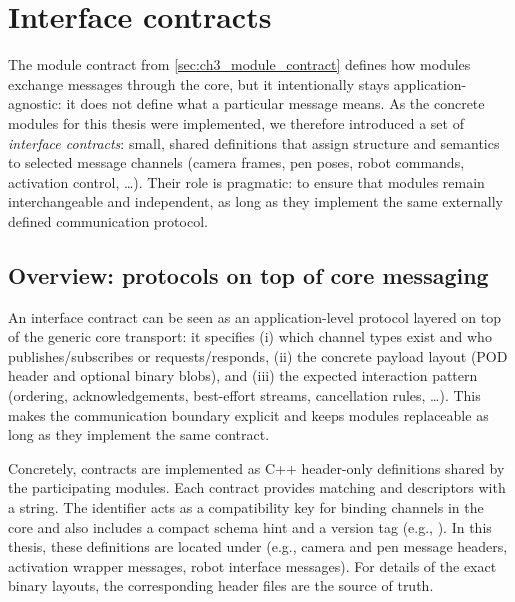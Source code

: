 \section{Interface contracts} \label{sec:ch3_interface_contracts}

The module contract from \autoref{sec:ch3_module_contract} defines how modules exchange messages through the core, but it intentionally stays application-agnostic: it does not define what a particular message means. As the concrete modules for this thesis were implemented, we therefore introduced a set of \emph{interface contracts}: small, shared definitions that assign structure and semantics to selected message channels (camera frames, pen poses, robot commands, activation control, \dots). Their role is pragmatic: to ensure that modules remain interchangeable and independent, as long as they implement the same externally defined communication protocol.

\subsection{Overview: protocols on top of core messaging} \label{subsec:ch3_interface_contracts_overview}

An interface contract can be seen as an application-level protocol layered on top of the generic core transport:
it specifies (i) which channel types exist and who publishes/subscribes or requests/responds, (ii) the concrete payload layout (POD header and optional binary blobs), and (iii) the expected interaction pattern (ordering, acknowledgements, best-effort streams, cancellation rules, \dots).
This makes the communication boundary explicit and keeps modules replaceable as long as they implement the same contract.

Concretely, contracts are implemented as C++ header-only definitions shared by the participating modules. Each contract provides matching  and  descriptors with a  string. The identifier acts as a compatibility key for binding channels in the core and also includes a compact schema hint and a version tag (e.g., ). In this thesis, these definitions are located under  (e.g., camera and pen message headers, activation wrapper messages, robot interface messages). For details of the exact binary layouts, the corresponding header files are the source of truth.

